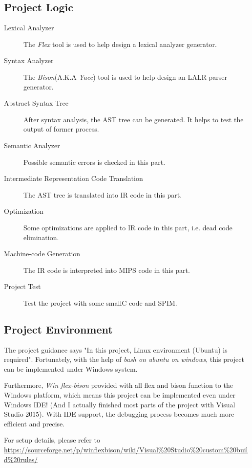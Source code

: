 \documentclass{article}
\begin{document}
\subsection{Project Logic}
\label{definitions}
\begin{description}
\item[Lexical Analyzer]  The \textit{Flex} tool is used to help design a lexical analyzer generator.
\item[Syntax Analyzer]   The \textit{Bison}(A.K.A \textit{Yacc}) tool is used to help design an LALR parser generator. 
\item[Abstract Syntax Tree] After syntax analysis, the AST tree can be generated. It helps to test the output of former process. 
\item[Semantic Analyzer] Possible semantic errors is checked in this part.
\item[Intermediate Representation Code Translation] The AST tree is translated into IR code in this part.
\item[Optimization] Some optimizations are applied to IR code in this part, i.e. dead code elimination.
\item[Machine-code Generation] The IR code is interpreted into MIPS code in this part.
\item[Project Test] Test the project with some smallC code and SPIM.
\end{description} 

\subsection{Project Environment}
The project guidance says "In this project, Linux environment (Ubuntu) is required". Fortunately, with the help of \textit{bash on ubuntu on windows}, this project can be implemented under Windows system. 

Furthermore,  
\textit{Win flex-bison} provided with all flex and bison function to the Windows platform, which means this project can be implemented even under Windows IDE! (And I actually finished most parts of the project with Visual Studio 2015). With IDE support, the debugging process becomes much more efficient and precise.

For setup details, please refer to \\
 \url{https://sourceforge.net/p/winflexbison/wiki/Visual%20Studio%20custom%20build%20rules/}
\end{document}
